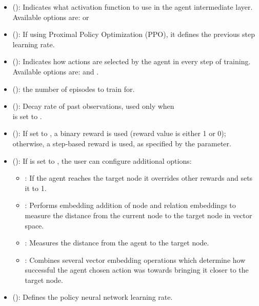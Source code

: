 \begin{itemize}
 \item {}  (): Indicates what activation function to use in the agent intermediate layer. Available options are: 
   or 
 \item {} (): If using Proximal Policy Optimization (PPO), it defines the previous step learning rate.
  \item {} (): Indicates how actions are selected by the agent in every step of training. Available options are:  and .
\item {} (): the number of episodes to train for.
\item {} (): Decay rate of past observations, used only when \\ is set to  .
  \item {} (): If set to , a binary reward is used (reward value is either 1 or 0); otherwise, a step-based reward is used, as specified by the  parameter.  
  \item {} (): If  is set to , the user can configure additional options:
  \begin{itemize}
    \item {}: If the agent reaches the target node it overrides other rewards and sets it to 1.
    \item {}: Performs embedding addition of node and relation embeddings to measure the distance from the current node to the target node in vector space.
    \item {}: Measures the distance from the agent to the target node.
    \item {}: Combines several vector embedding operations which determine how successful the agent chosen action was towards bringing it closer to the target node.
  \end{itemize}
   \item {} (): Defines the policy neural network learning rate.

\end{itemize}
